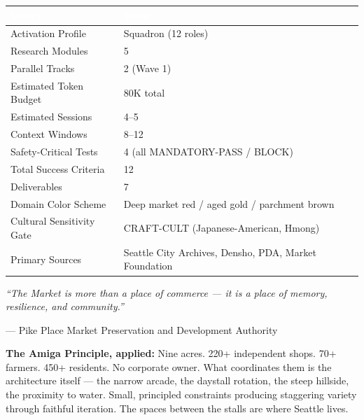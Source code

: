 \documentclass[11pt,letterpaper]{article}
\newcommand{\tableheader}[1]{\textbf{\sffamily\textcolor{white}{#1}}}
\begin{document}
\begin{center}
\begin{tabularx}{\textwidth}{L{5cm}X}
\toprule
{}
\tableheader{Metric} & \tableheader{Value} \\
\midrule
Activation Profile & Squadron (12 roles) \\
Research Modules & 5 \\
Parallel Tracks & 2 (Wave 1) \\
Estimated Token Budget & 80K total \\
Estimated Sessions & 4--5 \\
Context Windows & 8--12 \\
Safety-Critical Tests & 4 (all MANDATORY-PASS / BLOCK) \\
Total Success Criteria & 12 \\
Deliverables & 7 \\
Domain Color Scheme & Deep market red / aged gold / parchment brown \\
Cultural Sensitivity Gate & CRAFT-CULT (Japanese-American, Hmong) \\
Primary Sources & Seattle City Archives, Densho, PDA, Market Foundation \\
\bottomrule
\end{tabularx}
\end{center}

\vspace{2em}

\begin{quotebox}
\textit{``The Market is more than a place of commerce --- it is a place of memory, resilience, and community.''}

\vspace{0.5em}
--- Pike Place Market Preservation and Development Authority

\vspace{1em}
\textbf{The Amiga Principle, applied:} Nine acres. 220+ independent shops. 70+ farmers. 450+ residents. No corporate owner. What coordinates them is the architecture itself --- the narrow arcade, the daystall rotation, the steep hillside, the proximity to water. Small, principled constraints producing staggering variety through faithful iteration. The spaces between the stalls are where Seattle lives.
\end{quotebox}
\end{document}

